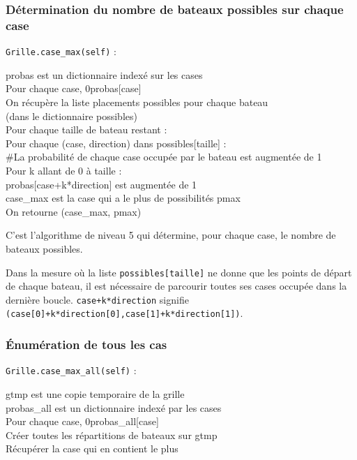\subsubsection{Détermination du nombre de bateaux possibles sur chaque case}\label{case_max}
\texttt{Grille.case\_max(self)} :
\begin{algo1}
probas est un dictionnaire indexé sur les cases\\
Pour chaque case, 0\sto probas[case]\\
On récupère la liste placements possibles pour chaque bateau\\
 (dans le dictionnaire possibles)\\
Pour chaque taille de bateau restant :\\
Pour chaque (case, direction) dans possibles[taille] :\\
\#La probabilité de chaque case occupée par le bateau est augmentée de 1\\
Pour k allant de 0 à taille :\\
probas[case+k*direction] est augmentée de 1\\
case\_max est la case qui a le plus de possibilités pmax\\
On retourne (case\_max, pmax)\\
\end{algo1}

C'est l'algorithme de niveau 5 qui détermine, pour chaque case, le nombre de bateaux possibles.

Dans la mesure où la liste \texttt{possibles[taille]} ne donne que les points de départ de chaque bateau, il est nécessaire de parcourir toutes ses cases occupée dans la dernière boucle. \texttt{case+k*direction} signifie \texttt{(case[0]+k*direction[0],case[1]+k*direction[1])}.

\newpage
\subsubsection{Énumération de tous les cas}\label{case_max_all}
\texttt{Grille.case\_max\_all(self)} :
\begin{algo1}
gtmp est une copie temporaire de la grille\\
probas\_all est un dictionnaire indexé par les cases\\
Pour chaque case, 0\sto probas\_all[case]\\
Créer toutes les répartitions de bateaux sur gtmp\\
Récupérer la case qui en contient le plus\\ 
\end{algo1}

